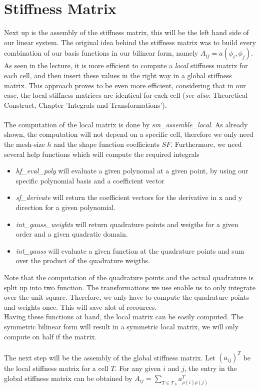 \documentclass[a4paper,12pt]{article}
\begin{document}
\section{Stiffness Matrix}
Next up is the assembly of the stiffness matrix, this will be the left hand side of our linear system. The original idea behind the stiffness matrix was to build every combination of our basis functions in our bilinear form, namely $A_{ij}=a(\phi_i,\phi_j)$. As seen in the lecture, it is more efficient to compute a \textit{local} stiffness matrix for each cell, and then insert these values in the right way in a global stiffness matrix. This approach proves to be even more efficient, considering that in our case, the local stiffness matrices are identical for each cell (\textit{see also}: Theoretical Construct, Chapter 'Integrals and Transformations').\\
\\
The computation of the local matrix is done by \textit{sm\_assemble\_local}. As already shown, the computation will not depend on a specific cell, therefore we only need the mesh-size $h$ and the shape function coefficients $SF$. Furthermore, we need several help functions which will compute the required integrals
\begin{itemize}
\item \textit{hf\_eval\_poly} will evaluate a given polynomal at a given point, by using our specific polynomial basis and a coefficient vector
\item \textit{sf\_derivate} will return the coefficient vectors for the derivative in x and y direction for a given polynomial. 
\item \textit{int\_gauss\_weights} will return quadrature points and weigths for a given order and a given quadratic domain.
\item \textit{int\_gauss} will evaluate a given function at the quadrature points and sum over the product of the quadrature weigths. 
\end{itemize} 
Note that the computation of the quadrature points and the actual quadrature is split up into two function. The transformations we use enable us to only integrate over the unit square. Therefore, we only have to compute the quadrature points and weights once. This will save alot of recources.\\
Having these functions at hand, the local matrix can be easily computed. The symmetric bilinear form will result in a symmetric local matrix, we will only compute on half if the matrix.\\
\\
The next step will be the assembly of the global stiffness matrix.
Let $(a_{ij})^T$ be the local stiffness matrix for a cell $T$. For any given $i$ and $j$, the entry in the global stiffness matrix can be obtained by $A_{ij}=\sum_{T \in \mathscr{T}_h}a_{\rho(i)\rho(j)}^T$ 
\end{document}
